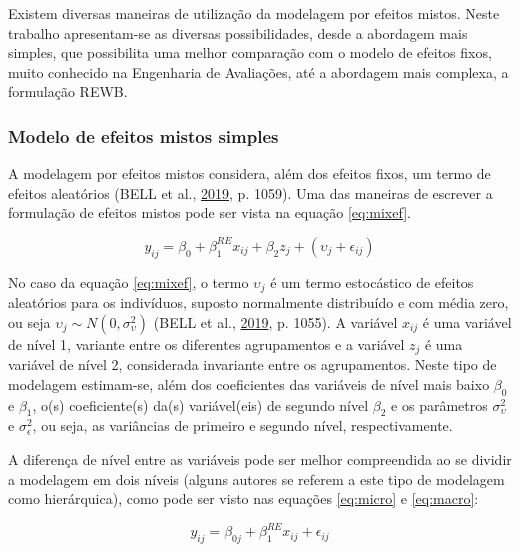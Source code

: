 \documentclass[
  a4paper, 11pt]{article}
\begin{document}
Existem diversas maneiras de utilização da modelagem por efeitos mistos.
Neste trabalho apresentam-se as diversas possibilidades, desde a
abordagem mais simples, que possibilita uma melhor comparação com o
modelo de efeitos fixos, muito conhecido na Engenharia de Avaliações,
até a abordagem mais complexa, a formulação REWB.

\hypertarget{modelo-de-efeitos-mistos-simples}{%
\subsubsection{Modelo de efeitos mistos
simples}\label{modelo-de-efeitos-mistos-simples}}

A modelagem por efeitos mistos considera, além dos efeitos fixos, um
termo de efeitos aleatórios (BELL et al.,
\protect\hyperlink{ref-bell2019}{2019}, p. 1059). Uma das maneiras de
escrever a formulação de efeitos mistos pode ser vista na equação
\ref{eq:mixef}.

\begin{equation} \label{eq:mixef}
y_{ij} = \beta_0 + \beta_1^{RE} x_{ij} + \beta_2 z_j + (\upsilon_j + \epsilon_{ij}) 
\end{equation}

No caso da equação \ref{eq:mixef}, o termo \(\upsilon_j\) é um termo
estocástico de efeitos aleatórios para os indivíduos, suposto
normalmente distribuído e com média zero, ou seja
\(\upsilon_j \sim N(0, \sigma_{\upsilon}^2)\) (BELL et al.,
\protect\hyperlink{ref-bell2019}{2019}, p. 1055). A variável \(x_{ij}\)
é uma variável de nível 1, variante entre os diferentes agrupamentos e a
variável \(z_j\) é uma variável de nível 2, considerada invariante entre
os agrupamentos. Neste tipo de modelagem estimam-se, além dos
coeficientes das variáveis de nível mais baixo \(\beta_0\) e
\(\beta_1\), o(s) coeficiente(s) da(s) variável(eis) de segundo nível
\(\beta_2\) e os parâmetros \(\sigma_\upsilon^2\) e
\(\sigma_\epsilon^2\), ou seja, as variâncias de primeiro e segundo
nível, respectivamente.

A diferença de nível entre as variáveis pode ser melhor compreendida ao
se dividir a modelagem em dois níveis (alguns autores se referem a este
tipo de modelagem como hierárquica), como pode ser visto nas equações
\ref{eq:micro} e \ref{eq:macro}:

\begin{equation} \label{eq:micro}
y_{ij} = \beta_{0j} + \beta_1^{RE} x_{ij} + \epsilon_{ij} 
\end{equation}
\end{document}

